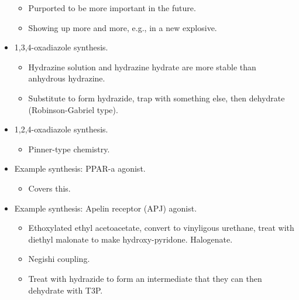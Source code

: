 \documentclass[../notes.tex]{subfiles}
\begin{document}
\begin{itemize}
\begin{itemize}
        \item Purported to be more important in the future.
        \item Showing up more and more, e.g., in a new explosive.
    \end{itemize}
    \item 1,3,4-oxadiazole synthesis.
    \begin{itemize}
        \item Hydrazine solution and hydrazine hydrate are more stable than anhydrous hydrazine.
        \item Substitute to form hydrazide, trap with something else, then dehydrate (Robinson-Gabriel type).
    \end{itemize}
    \item 1,2,4-oxadiazole synthesis.
    \begin{itemize}
        \item Pinner-type chemistry.
    \end{itemize}
    \item Example synthesis: PPAR-a agonist.
    \begin{itemize}
        \item Covers this.
    \end{itemize}
    \item Example synthesis: Apelin receptor (APJ) agonist.
    \begin{itemize}
        \item Ethoxylated ethyl acetoacetate, convert to vinyligous urethane, treat with diethyl malonate to make hydroxy-pyridone. Halogenate.
        \item Negishi coupling.
        \item Treat with hydrazide to form an intermediate that they can then dehydrate with T3P.
    \end{itemize}
\end{itemize}
\end{document}
